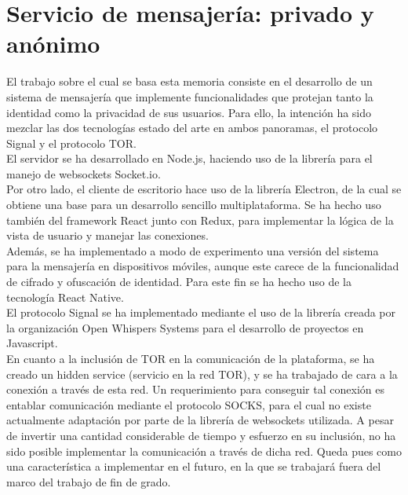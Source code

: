 \chapter{Servicio de mensajería: privado y anónimo}

El trabajo sobre el cual se basa esta memoria consiste en el desarrollo de un sistema de mensajería que implemente funcionalidades que protejan tanto la identidad como la privacidad de sus usuarios. Para ello, la intención ha sido mezclar las dos tecnologías estado del arte en ambos panoramas, el protocolo Signal y el protocolo TOR. \\

El servidor se ha desarrollado en Node.js, haciendo uso de la librería para el manejo de websockets Socket.io. \\

Por otro lado, el cliente de escritorio hace uso de la librería Electron, de la cual se obtiene una base para un desarrollo sencillo multiplataforma. Se ha hecho uso también del framework React junto con Redux, para implementar la lógica de la vista de usuario y manejar las conexiones. \\

Además, se ha implementado a modo de experimento una versión del sistema para la mensajería en dispositivos móviles, aunque este carece de la funcionalidad de cifrado y ofuscación de identidad. Para este fin se ha hecho uso de la tecnología React Native. \\

El protocolo Signal se ha implementado mediante el uso de la librería creada por la organización Open Whispers Systems para el desarrollo de proyectos en Javascript. \\

En cuanto a la inclusión de TOR en la comunicación de la plataforma, se ha creado un hidden service (servicio en la red TOR), y se ha trabajado de cara a la conexión a través de esta red. Un requerimiento para conseguir tal conexión es entablar comunicación mediante el protocolo SOCKS, para el cual no existe actualmente adaptación por parte de la librería de websockets utilizada. A pesar de invertir una cantidad considerable de tiempo y esfuerzo en su inclusión, no ha sido posible implementar la comunicación a través de dicha red. Queda pues como una característica a implementar en el futuro, en la que se trabajará fuera del marco del trabajo de fin de grado. \\ 

